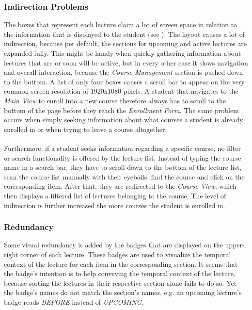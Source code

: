 \subsubsection{Indirection Problems}

The boxes that represent each lecture claim a lot of screen space in relation to the information that is displayed to the student (see ). The layout causes a lot of indirection, because per default, the sections for upcoming and active lectures are expanded fully. This might be handy when quickly gathering information about lectures that are or soon will be active, but in every other case it slows navigation and overall interaction, because the \emph{Course Management} section is pushed down to the bottom.
A list of only four boxes causes a scroll bar to appear on the very common screen resolution of 1920x1080 pixels. A student that navigates to the \emph{Main View} to enroll into a new course therefore always has to scroll to the bottom of the page before they reach the \emph{Enrollment Form}. The same problem occurs when simply seeking information about what courses a student is already enrolled in or when trying to leave a course altogether. 
\\
\\
Furthermore, if a student seeks information regarding a specific course, no filter or search functionality is offered by the lecture list. Instead of typing the course name in a search bar, they have to scroll down to the bottom of the lecture list, scan the course list manually with their eyeballs, find the course and click on the corresponding item. After that, they are redirected to the \emph{Course View}, which then displays a filtered list of lectures belonging to the course. The level of indirection is further increased the more courses the student is enrolled in. 


\subsubsection{Redundancy}

Some visual redundancy is added by the badges that are displayed on the upper-right corner of each lecture. These badges are used to visualize the temporal context of the lecture for each item in the corresponding section. It seems that the badge's intention is to help conveying the temporal context of the lecture, because sorting the lectures in their respective section alone fails to do so.
Yet the badge's names do not match the section's names, e.g. an upcoming lecture's badge reads \emph{BEFORE} instead of \emph{UPCOMING}. 


